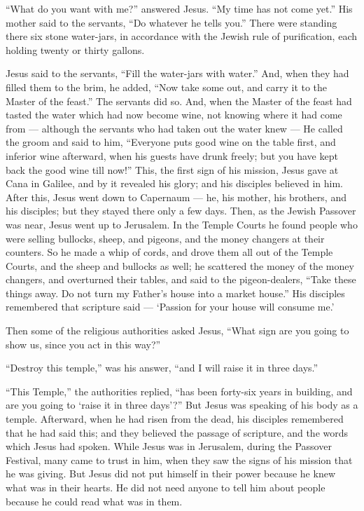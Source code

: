  ``What do you want with me?'' answered Jesus. ``My time has
not come yet.''  His mother said to the servants, ``Do
whatever he tells you.''  There were standing there six
stone water-jars, in accordance with the Jewish rule of purification,
each holding twenty or thirty gallons.

 Jesus said to the servants, ``Fill the water-jars with
water.''  And, when they had filled them to the brim, he
added, ``Now take some out, and carry it to the Master of the feast.''
The servants did so.  And, when the Master of the feast had
tasted the water which had now become wine, not knowing where it had
come from --- although the servants who had taken out the water knew ---
 He called the groom and said to him, ``Everyone puts good
wine on the table first, and inferior wine afterward, when his guests
have drunk freely; but you have kept back the good wine till now!''
 This, the first sign of his mission, Jesus gave at Cana in
Galilee, and by it revealed his glory; and his disciples believed in
him.  After this, Jesus went down to Capernaum --- he, his
mother, his brothers, and his disciples; but they stayed there only a
few days.  Then, as the Jewish Passover was near, Jesus
went up to Jerusalem.  In the Temple Courts he found people
who were selling bullocks, sheep, and pigeons, and the money changers at
their counters.  So he made a whip of cords, and drove them
all out of the Temple Courts, and the sheep and bullocks as well; he
scattered the money of the money changers, and overturned their tables,
 and said to the pigeon-dealers, ``Take these things away.
Do not turn my Father's house into a market house.''  His
disciples remembered that scripture said --- `Passion for your house
will consume me.'

 Then some of the religious authorities asked Jesus, ``What
sign are you going to show us, since you act in this way?''

 ``Destroy this temple,'' was his answer, ``and I will
raise it in three days.''

 ``This Temple,'' the authorities replied, ``has been
forty-six years in building, and are you going to `raise it in three
days'?''  But Jesus was speaking of his body as a temple.
 Afterward, when he had risen from the dead, his disciples
remembered that he had said this; and they believed the passage of
scripture, and the words which Jesus had spoken.  While
Jesus was in Jerusalem, during the Passover Festival, many came to trust
in him, when they saw the signs of his mission that he was giving.
 But Jesus did not put himself in their power because he
knew what was in their hearts.  He did not need anyone to
tell him about people because he could read what was in them.

